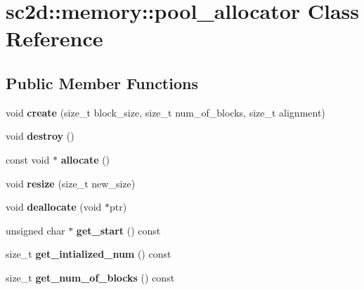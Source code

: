 \hypertarget{classsc2d_1_1memory_1_1pool__allocator}{}\section{sc2d\+:\+:memory\+:\+:pool\+\_\+allocator Class Reference}
\label{classsc2d_1_1memory_1_1pool__allocator}
\subsection*{Public Member Functions}
\begin{DoxyCompactItemize}
\item 
\mbox{\label{classsc2d_1_1memory_1_1pool__allocator_a91c77a66c8e6c74c9dae87dc5ad7956a}} 
void {\bfseries create} (size\+\_\+t block\+\_\+size, size\+\_\+t num\+\_\+of\+\_\+blocks, size\+\_\+t alignment)
\item 
\mbox{\label{classsc2d_1_1memory_1_1pool__allocator_ab313582eae462597924ad43cce564ed4}} 
void {\bfseries destroy} ()
\item 
\mbox{\label{classsc2d_1_1memory_1_1pool__allocator_a927cfc82bd3dbf089d3b2a20b4260e6a}} 
const void $\ast$ {\bfseries allocate} ()
\item 
\mbox{\label{classsc2d_1_1memory_1_1pool__allocator_a223110342f8987b6637800a34f692010}} 
void {\bfseries resize} (size\+\_\+t new\+\_\+size)
\item 
\mbox{\label{classsc2d_1_1memory_1_1pool__allocator_a700f43f95cdf86714a4df5bc727d8919}} 
void {\bfseries deallocate} (void $\ast$ptr)
\item 
\mbox{\label{classsc2d_1_1memory_1_1pool__allocator_a9d6c4623e47051e497b5deb8f0cfbdb9}} 
unsigned char $\ast$ {\bfseries get\+\_\+start} () const
\item 
\mbox{\label{classsc2d_1_1memory_1_1pool__allocator_ac2326a5a29b93d5aaa1ef552a43408b4}} 
size\+\_\+t {\bfseries get\+\_\+intialized\+\_\+num} () const
\item 
\mbox{\label{classsc2d_1_1memory_1_1pool__allocator_a0bb6d57bf2b24b374e96ca12d7557e3f}} 
size\+\_\+t {\bfseries get\+\_\+num\+\_\+of\+\_\+blocks} () const
\end{DoxyCompactItemize}
